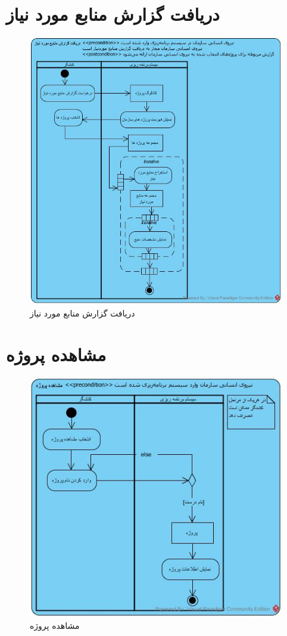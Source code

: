 \section{دریافت گزارش منابع مورد نیاز}
\begin{figure}[H]
	\centering
	\includegraphics[scale=0.7]{img/activity/RequiredResourcesReport}
	\caption{دریافت گزارش منابع مورد نیاز}
\end{figure}

\section{مشاهده پروژه}
\begin{figure}[H]
	\centering
	\includegraphics[scale=0.9]{img/activity/ViewProject}
	\caption{مشاهده پروژه}
\end{figure}


